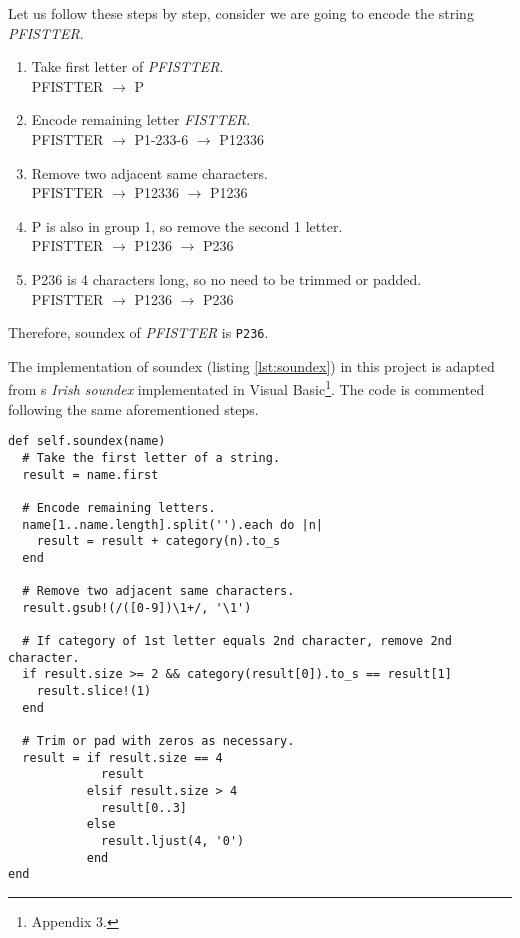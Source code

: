 Let us follow these steps by step, consider we are going to encode the string
\emph{PFISTTER}.

\begin{enumerate}
  \item Take first letter of \emph{PFISTTER}. \\
    PFISTTER $\rightarrow$ P
  \item Encode remaining letter \emph{FISTTER}. \\
    PFISTTER $\rightarrow$ P1-233-6 $\rightarrow$ P12336
  \item Remove two adjacent same characters. \\
    PFISTTER $\rightarrow$ P12336 $\rightarrow$ P1236
  \item P is also in group 1, so remove the second 1 letter. \\
    PFISTTER $\rightarrow$ P1236 $\rightarrow$ P236
  \item P236 is 4 characters long, so no need to be trimmed or padded. \\
    PFISTTER $\rightarrow$ P1236 $\rightarrow$ P236
\end{enumerate}

Therefore, soundex of \emph{PFISTTER} is \texttt{P236}.

The implementation of soundex (listing \ref{lst:soundex}) in this project is adapted from
\citeauthor{adamw}\textquotesingle s \emph{Irish soundex} implementated in Visual Basic\footnote{\cite{adamw} Appendix 3.}.
The code is commented following the same aforementioned steps.

\begin{minipage}{\linewidth}
\begin{lstlisting}[label={lst:soundex}, caption={Soundex implementation.}]
def self.soundex(name)
  # Take the first letter of a string.
  result = name.first

  # Encode remaining letters.
  name[1..name.length].split('').each do |n|
    result = result + category(n).to_s
  end

  # Remove two adjacent same characters.
  result.gsub!(/([0-9])\1+/, '\1')

  # If category of 1st letter equals 2nd character, remove 2nd character.
  if result.size >= 2 && category(result[0]).to_s == result[1]
    result.slice!(1)
  end

  # Trim or pad with zeros as necessary.
  result = if result.size == 4
             result
           elsif result.size > 4
             result[0..3]
           else
             result.ljust(4, '0')
           end
end
\end{lstlisting}
\end{minipage}

